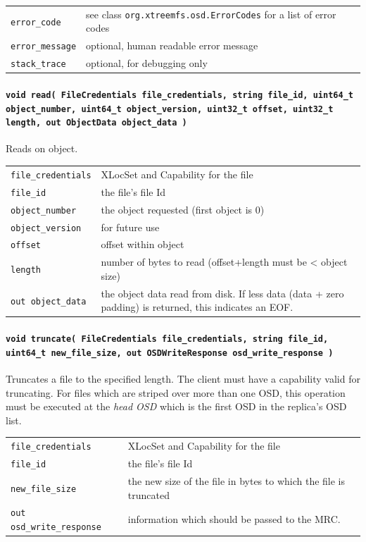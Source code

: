 \begin{tabularx}{\textwidth}{lX}
 \texttt{error\_code} & see class \texttt{org.xtreemfs.osd.ErrorCodes} for a list of error codes\\
 \texttt{error\_message} & optional, human readable error message\\
 \texttt{stack\_trace} & optional, for debugging only\\
\end{tabularx}




\paragraph{\texttt{void read( FileCredentials file\_credentials, string file\_id, uint64\_t object\_number, uint64\_t object\_version, uint32\_t offset, uint32\_t length, out ObjectData object\_data~)}}
Reads on object.

\begin{tabularx}{\textwidth}{lX}
 \texttt{file\_credentials} & XLocSet and Capability for the file\\
 \texttt{file\_id} & the file's file Id\\
 \texttt{object\_number} & the object requested (first object is 0)\\
 \texttt{object\_version} & for future use\\
 \texttt{offset} & offset within object\\
 \texttt{length} & number of bytes to read (offset+length must be < object size)\\
 \texttt{out object\_data} & the object data read from disk. If less data (data + zero padding) is returned, this indicates an EOF.\\
\end{tabularx}


\paragraph{\texttt{void truncate( FileCredentials file\_credentials, string file\_id, uint64\_t new\_file\_size, out OSDWriteResponse osd\_write\_response~)}}
Truncates a file to the specified length. The client must have a capability valid for truncating. For files which are striped over more than one OSD, this operation must be executed at the \textit{head OSD} which is the first OSD in the replica's OSD list.

\begin{tabularx}{\textwidth}{lX}
 \texttt{file\_credentials} & XLocSet and Capability for the file\\
 \texttt{file\_id} & the file's file Id\\
 \texttt{new\_file\_size} & the new size of the file in bytes to which the file is truncated\\
 \texttt{out osd\_write\_response} & information which should be passed to the MRC\index{MRC}.\\
\end{tabularx}



